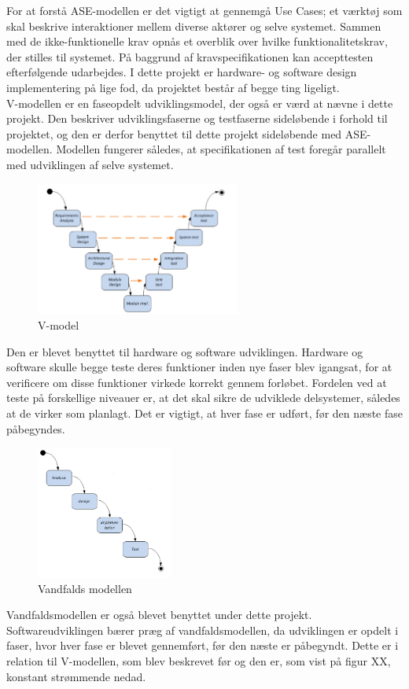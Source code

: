 For at forstå ASE-modellen er det vigtigt at gennemgå Use Cases; et værktøj som skal beskrive interaktioner mellem diverse aktører og selve systemet. Sammen med de ikke-funktionelle krav opnås et overblik over hvilke funktionalitetskrav, der stilles til systemet. På baggrund af kravspecifikationen kan accepttesten efterfølgende udarbejdes. I dette projekt er hardware- og software design implementering på lige fod, da projektet består af begge ting ligeligt.\\
\newline
V-modellen er en faseopdelt udviklingsmodel, der også er værd at nævne i dette projekt. Den beskriver udviklingsfaserne og testfaserne sideløbende i forhold til projektet, og den er derfor benyttet til dette projekt sideløbende med ASE-modellen. Modellen fungerer således, at specifikationen af test foregår parallelt med udviklingen af selve systemet.
\begin{figure}[H]
	\centering
	\includegraphics[width=0.6\textwidth]{Figurer/VModellen}
	\caption{V-model}
	\label{fig:V_Modellen}
\end{figure}
Den er blevet benyttet til hardware og software udviklingen. Hardware og software skulle begge teste deres funktioner inden nye faser blev igangsat, for at verificere om disse funktioner virkede korrekt gennem forløbet. Fordelen ved at teste på forskellige niveauer er, at det skal sikre de udviklede delsystemer, således at de virker som planlagt. Det er vigtigt, at hver fase er udført, før den næste fase påbegyndes. 
\begin{figure}[H]
	\centering
	\includegraphics[width=0.4\textwidth]{Figurer/VandfaldsModellen}
	\caption{Vandfalds modellen}
	\label{fig:vandfalds_model}
\end{figure}
Vandfaldsmodellen er også blevet benyttet under dette projekt. Softwareudviklingen bærer præg af vandfaldsmodellen, da udviklingen er opdelt i faser, hvor hver fase er blevet gennemført, før den næste er påbegyndt. Dette er i relation til V-modellen, som blev beskrevet før og den er, som vist på figur XX, konstant strømmende nedad. 



